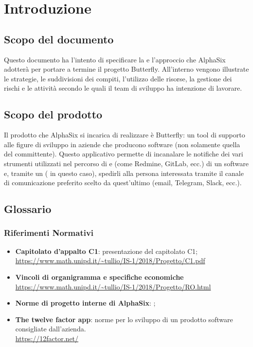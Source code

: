 \newpage
\section{Introduzione} \label{Introduzione}
	
	\subsection{Scopo del documento}
	Questo documento ha l'intento di specificare la  e l'approccio che AlphaSix adotterà per portare a termine il progetto Butterfly.
	All'interno vengono illustrate le strategie, le suddivisioni dei compiti, l'utilizzo delle risorse, la gestione dei rischi e le attività secondo le quali il team di sviluppo ha intenzione di lavorare.
	
	\subsection{Scopo del prodotto}	
	Il prodotto che AlphaSix si incarica di realizzare è Butterfly: un tool di supporto alle figure di sviluppo in aziende che producono software (non solamente quella del committente).
	Questo applicativo permette di incanalare le notifiche dei vari strumenti utilizzati nel percorso di  e  (come Redmine, GitLab, ecc.) di un software e, tramite un  ( in questo caso), spedirli alla persona interessata tramite il canale di comunicazione
	preferito scelto da quest'ultimo (email, Telegram, Slack, ecc.).
	
	\subsection{Glossario}
		\subsubsection{Riferimenti Normativi}
			\begin{itemize}
				\item \textbf{Capitolato d'appalto C1}: presentazione del capitolato C1;\\
				\url{https://www.math.unipd.it/~tullio/IS-1/2018/Progetto/C1.pdf}
				\item \textbf{Vincoli di organigramma e specifiche economiche}\\
				\url{https://www.math.unipd.it/~tullio/IS-1/2018/Progetto/RO.html}
				\item \textbf{Norme di progetto interne di AlphaSix}: \NdPv;
				\item \textbf{The twelve factor app}: norme per lo sviluppo di un prodotto software consigliate dall'azienda.\\
				\url{https://12factor.net/}
			\end{itemize}
		
